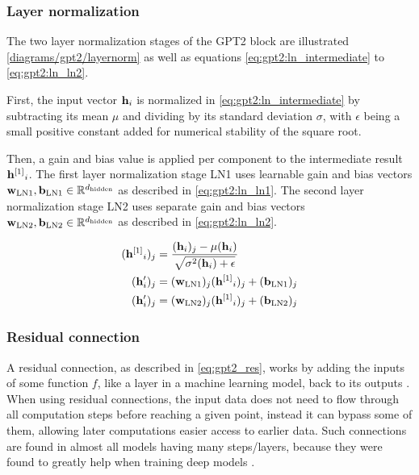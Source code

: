 \subsubsection{Layer normalization}
\label{gpt2:layernorm}

The two layer normalization stages of the GPT2 block are illustrated \cref{diagrams/gpt2/layernorm} as well as equations \eqref{eq:gpt2:ln_intermediate} to \eqref{eq:gpt2:ln_ln2}.

First, the input vector ${\mathbf{h}}_i$ is normalized in \cref{eq:gpt2:ln_intermediate} by subtracting its mean $\mu$ and dividing by its standard deviation $\sigma$, with $\epsilon$ being a small positive constant added for numerical stability of the square root.

Then, a gain and bias value is applied per component to the intermediate result ${{\mathbf{h}}^{[1]}}_i$. The first layer normalization stage LN1 uses learnable gain and bias vectors $\mathbf{w}_\mathrm{LN1}, \mathbf{b}_\mathrm{LN1} \in \mathbb{R}^{d_\textrm{hidden}}$ as described in \cref{eq:gpt2:ln_ln1}.
The second layer normalization stage LN2 uses separate gain and bias vectors $\mathbf{w}_\mathrm{LN2}, \mathbf{b}_\mathrm{LN2} \in \mathbb{R}^{d_\textrm{hidden}}$ as described in \cref{eq:gpt2:ln_ln2}.


\begin{align}
	({{\mathbf{h}}^{[1]}}_i)_j &= \frac
		{({\mathbf{h}}_i)_j - \mu({\mathbf{h}}_i)}
		{\sqrt {\sigma^2({\mathbf{h}}_i)+\epsilon}}
	\label{eq:gpt2:ln_intermediate}
	\\
	({\mathbf{h}}'_i)_j &= (\mathbf{w}_{\textrm{LN1}})_j ({{\mathbf{h}}^{[1]}}_i)_j + (\mathbf{b}_{\textrm{LN1}})_j
	\label{eq:gpt2:ln_ln1}
	\\
	({\mathbf{h}}'_i)_j &= (\mathbf{w}_{\textrm{LN2}})_j ({{\mathbf{h}}^{[1]}}_i)_j + (\mathbf{b}_{\textrm{LN2}})_j
	\label{eq:gpt2:ln_ln2}
\end{align}


\subsubsection{Residual connection}
\label{gpt2:residual}

A residual connection, as described in \cref{eq:gpt2_res}, works by adding the inputs of some function $f$, like a layer in a machine learning model, back to its outputs  \cite{residual}.
When using residual connections, the input data does not need to flow through all computation steps before reaching a given point, instead it can bypass some of them, allowing later computations easier access to earlier data.
Such connections are found in almost all models having many steps/layers, because they were found to greatly help when training deep models .

